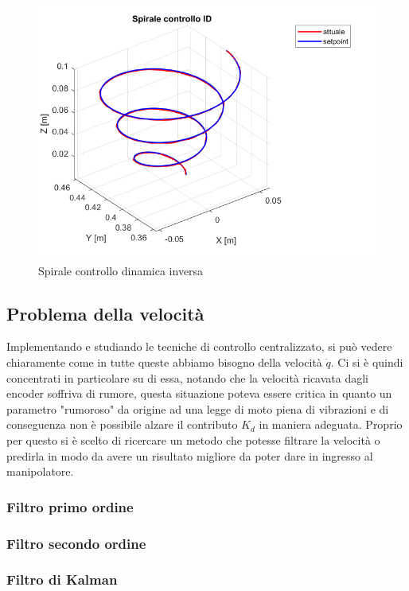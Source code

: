\begin{figure}[ht]
	\begin{center}
		\includegraphics[scale=0.45]{Immagini/Traiettorie/SpiraleID}
		\caption{Spirale controllo dinamica inversa}
		\label{fig:SpiraleID}
	\end{center}
\end{figure}
\subsection{Problema della velocità}
Implementando e studiando le tecniche di controllo centralizzato, si può vedere chiaramente come in tutte queste abbiamo bisogno della velocità $\dot{q}$. Ci si è quindi concentrati in particolare su di essa, notando che la velocità ricavata dagli encoder soffriva di rumore, questa situazione poteva essere critica in quanto un parametro "rumoroso" da origine ad una legge di moto piena di vibrazioni e di conseguenza non è possibile alzare il contributo $K_d$ in maniera adeguata. Proprio per questo si è scelto di ricercare un metodo che potesse filtrare la velocità o predirla in modo da avere un risultato migliore da poter dare in ingresso al manipolatore.
\subsubsection*{Filtro primo ordine}
\subsubsection*{Filtro secondo ordine}
\subsubsection*{Filtro di Kalman}
